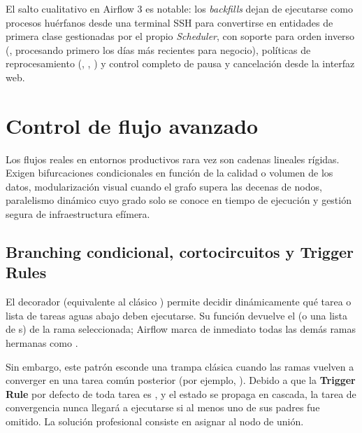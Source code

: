 El salto cualitativo en Airflow 3  es notable: los \textit{backfills} dejan de ejecutarse como procesos huérfanos desde una terminal SSH para convertirse en entidades de primera clase gestionadas por el propio \textit{Scheduler}, con soporte para orden inverso (, procesando primero los días más recientes para negocio), políticas de reprocesamiento (, , ) y control completo de pausa y cancelación desde la interfaz web.

\section{Control de flujo avanzado}\label{sec:control-flujo-avanzado}

Los flujos reales en entornos productivos rara vez son cadenas lineales rígidas. Exigen bifurcaciones condicionales en función de la calidad o volumen de los datos, modularización visual cuando el grafo supera las decenas de nodos, paralelismo dinámico cuyo grado solo se conoce en tiempo de ejecución y gestión segura de infraestructura efímera.

\subsection{Branching condicional, cortocircuitos y Trigger Rules}

El decorador  (equivalente al clásico ) permite decidir dinámicamente qué tarea o lista de tareas aguas abajo deben ejecutarse. Su función devuelve el  (o una lista de s) de la rama seleccionada; Airflow marca de inmediato todas las demás ramas hermanas como .

Sin embargo, este patrón esconde una trampa clásica cuando las ramas vuelven a converger en una tarea común posterior (por ejemplo, ). Debido a que la \textbf{Trigger Rule} por defecto de toda tarea es , y el estado  se propaga en cascada, la tarea de convergencia nunca llegará a ejecutarse si al menos uno de sus padres fue omitido. La solución profesional consiste en asignar  al nodo de unión.

